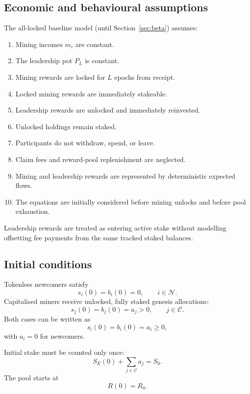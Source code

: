 \documentclass[11pt,a4paper]{article}
\begin{document}
\subsection{Economic and behavioural assumptions}
The all-locked baseline model (until Section~\ref{sec:beta}) assumes:
\begin{enumerate}
\item Mining incomes $m_i$ are constant.
\item The leadership pot $P_L$ is constant.
\item Mining rewards are locked for $L$ epochs from receipt.
\item Locked mining rewards are immediately stakeable.
\item Leadership rewards are unlocked and immediately reinvested.
\item Unlocked holdings remain staked.
\item Participants do not withdraw, spend, or leave.
\item Claim fees and reward-pool replenishment are neglected.
\item Mining and leadership rewards are represented by deterministic expected flows.
\item The equations are initially considered before mining unlocks and before pool exhaustion.
\end{enumerate}
Leadership rewards are treated as entering active stake without modelling offsetting fee payments from the same tracked staked balances.

\subsection{Initial conditions}
Tokenless newcomers satisfy
\begin{equation}
s_i(0)=b_i(0)=0,\qquad i\in\mathcal N.
\end{equation}
Capitalised miners receive unlocked, fully staked genesis allocations:
\begin{equation}
s_j(0)=b_j(0)=a_j>0,\qquad j\in\mathcal C.
\end{equation}
Both cases can be written as
\begin{equation}
s_i(0)=b_i(0)=a_i\ge0,
\end{equation}
with $a_i=0$ for newcomers.

Initial stake must be counted only once:
\begin{equation}
\boxed{S_E(0)+\sum_{j\in\mathcal C}a_j=S_0.}
\end{equation}
The pool starts at
\begin{equation}
R(0)=R_0.
\end{equation}
\end{document}
